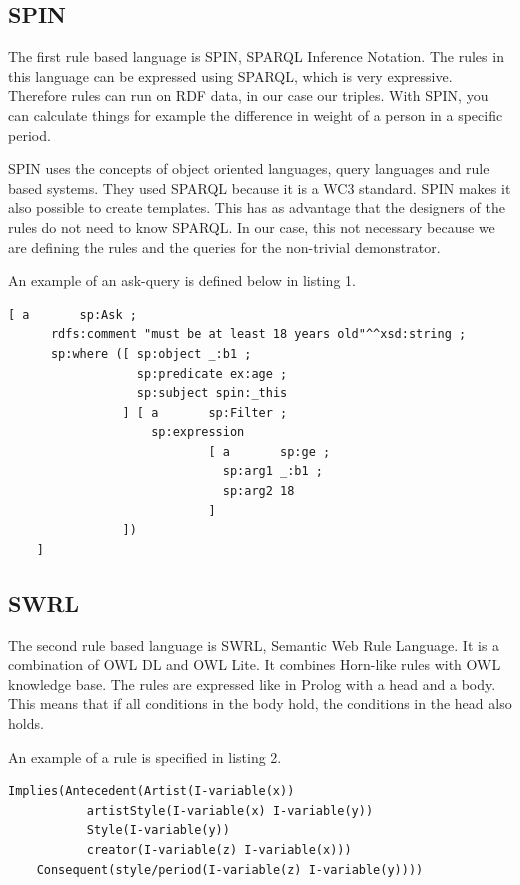 \subsection*{SPIN}
The first rule based language is SPIN, SPARQL Inference Notation. The rules in this language can be expressed using SPARQL, which is very expressive. Therefore rules can run on RDF data, in our case our triples. With SPIN, you can calculate things for example the difference in weight of a person in a specific period. 

SPIN uses the concepts of object oriented languages, query languages and rule based systems. They used SPARQL because it is a WC3 standard. 
SPIN makes it also possible to create templates. This has as advantage that the designers of the rules do not need to know SPARQL. In our case, this not necessary because we are defining the rules and the queries for the non-trivial demonstrator. 

An example of an ask-query is defined below in listing 1.

\begin{lstlisting}[caption={Example of query using SPIN}]
[ a       sp:Ask ;
      rdfs:comment "must be at least 18 years old"^^xsd:string ;
      sp:where ([ sp:object _:b1 ;
                  sp:predicate ex:age ;
                  sp:subject spin:_this
                ] [ a       sp:Filter ;
                    sp:expression
                            [ a       sp:ge ;
                              sp:arg1 _:b1 ;
                              sp:arg2 18
                            ]
                ])
    ]
\end{lstlisting}

\subsection*{SWRL}
The second rule based language is SWRL, Semantic Web Rule Language. It is a combination of OWL DL and OWL Lite. It combines Horn-like rules with OWL knowledge base. The rules are expressed like in Prolog with a head and a body. This means that if all conditions in the body hold, the conditions in the head also holds. 

An example of a rule is specified in listing 2.
\begin{lstlisting}[caption={Example of query using SWRL}]
Implies(Antecedent(Artist(I-variable(x)) 
		   artistStyle(I-variable(x) I-variable(y))
		   Style(I-variable(y))
		   creator(I-variable(z) I-variable(x)))
	Consequent(style/period(I-variable(z) I-variable(y))))
\end{lstlisting}

